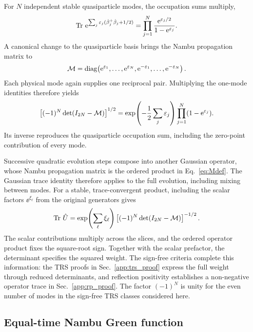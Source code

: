 For $N$ independent stable quasiparticle modes, the occupation sums multiply,
\begin{equation}
    \operatorname{Tr}\,\mathrm{e}^{\sum_j\varepsilon_j(\hat\beta_j^+\hat\beta_j+1/2)}
    =\prod_{j=1}^{N}\frac{\mathrm{e}^{\varepsilon_j/2}}{1-\mathrm{e}^{\varepsilon_j}}.
\end{equation}
A canonical change to the quasiparticle basis brings the Nambu propagation matrix to
\begin{equation}
    \mathcal{M}=\operatorname{diag}\!\left(
        \mathrm{e}^{\varepsilon_1},\ldots,\mathrm{e}^{\varepsilon_N},
        \mathrm{e}^{-\varepsilon_1},\ldots,\mathrm{e}^{-\varepsilon_N}
    \right).
\end{equation}
Each physical mode again supplies one reciprocal pair. Multiplying the one-mode identities therefore yields
\begin{equation}
    \left[(-1)^N\det(I_{2N}-\mathcal{M})\right]^{1/2}
    =\exp\!\left(-\frac12\sum_j\varepsilon_j\right)
    \prod_{j=1}^{N}(1-\mathrm{e}^{\varepsilon_j}).
\end{equation}
Its inverse reproduces the quasiparticle occupation sum, including the zero-point contribution of every mode.

Successive quadratic evolution steps compose into another Gaussian operator, whose Nambu propagation matrix is the ordered product in Eq.~\eqref{eq:Mdef}. The Gaussian trace identity therefore applies to the full evolution, including mixing between modes. For a stable, trace-convergent product, including the scalar factors $\ee^{\xi_\ell}$ from the original generators gives~\cite{munn1978ensemble}
\begin{equation}
    \operatorname{Tr}\,\hat U
    =\exp\!\left(\sum_\ell\xi_\ell\right)
    \left[(-1)^N\det(I_{2N}-\mathcal{M})\right]^{-1/2}.
    \label{eq:paired_trace_formula_appendix}
\end{equation}
The scalar contributions multiply across the slices, and the ordered operator product fixes the square-root sign. Together with the scalar prefactor, the determinant specifies the squared weight. The sign-free criteria complete this information: the TRS proofs in Sec.~\ref{app:trs_proof} express the full weight through reduced determinants, and reflection positivity establishes a non-negative operator trace in Sec.~\ref{app:rp_proof}. The factor $(-1)^N$ is unity for the even number of modes in the sign-free TRS classes considered here.

\subsection{Equal-time Nambu Green function}
\label{app:green_paired}

